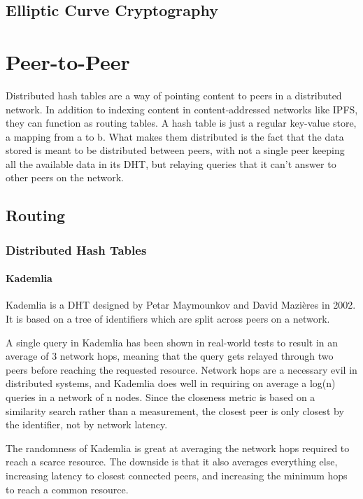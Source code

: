 \section{Elliptic Curve Cryptography}
						
\chapter{Peer-to-Peer}
\label{Peer-to-Peer}
Distributed hash tables are a way of pointing content to peers in a distributed network. In addition to indexing content in content-addressed networks like IPFS, they can function as routing tables. A hash table is just a regular key-value store, a mapping from a to b. What makes them distributed is the fact that the data stored is meant to be distributed between peers, with not a single peer keeping all the available data in its DHT, but relaying queries that it can't answer to other peers on the network.
						
\section{Routing}
						
						
\subsection{Distributed Hash Tables}
						
\subsubsection{Kademlia}
Kademlia is a DHT designed by Petar Maymounkov and David Mazières in 2002. It is based on a tree of identifiers which are split across peers on a network.
						
A single query in Kademlia has been shown in real-world tests to result in an average of 3 network hops, meaning that the query gets relayed through two peers before reaching the requested resource.\cite{Roos2013-mb} Network hops are a necessary evil in distributed systems, and Kademlia does well in requiring on average a log(n) queries in a network of n nodes. Since the closeness metric is based on a similarity search rather than a measurement, the closest peer is only closest by the identifier, not by network latency.
						
The randomness of Kademlia is great at averaging the network hops required to reach a scarce resource. The downside is that it also averages everything else, increasing latency to closest connected peers, and increasing the minimum hops to reach a common resource.
